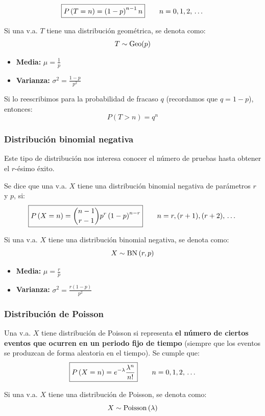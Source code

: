 \documentclass[a4paper]{book}
\begin{document}
\[\boxed{P\left( T=n \right)= \left( 1-p \right)^{n-1}n} \qquad n= 0,1,2,\, \ldots \,\]

Si una v.a. $T$ tiene una distribución geométrica, se denota como: \[T \sim \operatorname{Geo}(p)\]

\begin{itemize}
	\item \textbf{Media:} $\displaystyle{\mu = \frac{1}{p}}$
	\item \textbf{Varianza:} $\displaystyle{\sigma ^2 = \frac{1-p}{p^2}}$
\end{itemize}

\begin{nota}
	Si lo reescribimos para la probabilidad de fracaso $q$ (recordamos que $q = 1-p$), entonces: \[P\left( T>n \right) = q^n\]
\end{nota}

\subsubsection{Distribución binomial negativa}
Este tipo de distribución nos interesa conocer el número de pruebas hasta obtener el $r$-ésimo éxito.

Se dice que una v.a. $X$ tiene una distribución binomial negativa de parámetros $r$ y $p$, si: \[\boxed{P\left( X=n \right)={\binom{n-1}{r-1}} p^r\left( 1-p \right)^{n-r}} \qquad n= r,(r+1),(r+2),\, \ldots \, \]

Si una v.a. $X$ tiene una distribución binomial negativa, se denota como: \[X \sim \operatorname{BN} \left( r,p \right)\]

\begin{itemize}
	\item \textbf{Media:} $\displaystyle{\mu = \frac{r}{p}}$
	\item \textbf{Varianza:} $\displaystyle{\sigma ^2 = \frac{r(1-p)}{p^2}}$
\end{itemize}

\subsubsection{Distribución de Poisson}
Una v.a. $X$ tiene distribución de Poisson si representa \textbf{el número de ciertos eventos que ocurren en un periodo fijo de tiempo} (siempre que los eventos se produzcan de forma aleatoria en el tiempo). Se cumple que: \[\boxed{P\left( X=n \right)=e^{-\lambda} \frac{\lambda ^n}{n!}} \qquad n= 0,1,2,\, \ldots \, \]

Si una v.a. $X$ tiene una distribución de Poisson, se denota como: \[X \sim \operatorname{Poisson} \left( \lambda \right)\]
\end{document}
